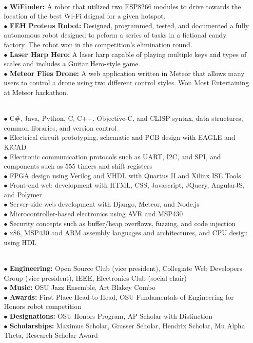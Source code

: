 \documentclass[10pt]{article}
\begin{document}
\\
$\bullet$ {\bf WiFinder:} A robot that utilized two ESP8266 modules to drive towards the location of the best Wi-Fi dsignal for a given hotspot.\\
$\bullet$ {\bf FEH Proteus Robot:} Designed, programmed, tested, and documented a fully autonomous robot designed to peform a series of tasks in a fictional candy factory. The robot won in the competition's elimination round.\\
$\bullet$ {\bf Laser Harp Hero:} A laser harp capable of playing multiple keys and types of scales and includes a Guitar Hero-style game.\\
$\bullet$ {\bf Meteor Flies Drone:} A web application written in Meteor that allows many users to control a drone using two different control styles. Won Most Entertaining at Meteor hackathon.\\
\medskip

\\
$\bullet$ C\#, Java, Python, C, C++, Objective-C, and CLISP syntax, data structures, common libraries, and version control\\
$\bullet$ Electrical circuit prototyping, schematic and PCB design with EAGLE and KiCAD\\
$\bullet$ Electronic communication protocols such as UART, I2C, and SPI, and components such as 555 timers and shift registers\\
$\bullet$ FPGA design using Verilog and VHDL with Quartus II and Xilinx ISE Tools\\
$\bullet$ Front-end web development with HTML, CSS, Javascript, JQuery, AngularJS, and Polymer\\
$\bullet$ Server-side web development with Django, Meteor, and Node.js\\
$\bullet$ Microcontroller-based electronics using AVR and MSP430\\
$\bullet$ Security concepts such as buffer/heap overflows, fuzzing, and code injection\\
$\bullet$ x86, MSP430 and ARM assembly languages and architectures, and CPU design using HDL
\medskip

\\
$\bullet$ {\bf Engineering:} Open Source Club (vice president), Collegiate Web Developers Group (vice president), IEEE, Electronics Club (social chair)\\
$\bullet$ {\bf Music:} OSU Jazz Ensemble, Art Blakey Combo\\
$\bullet$ {\bf Awards:} First Place Head to Head, OSU Fundamentals of Engineering for Honors robot competition\\
$\bullet$ {\bf Designations:} OSU Honors Program, AP Scholar with Distinction\\
$\bullet$ {\bf Scholarships:} Maximus Scholar, Grasser Scholar, Hendrix Scholar, Mu Alpha Theta, Research Scholar Award
\medskip
\end{document}
